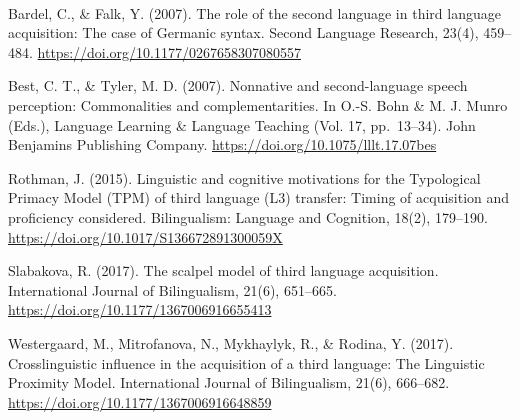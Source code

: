 \documentclass[
  12pt,
]{article}
\begin{document}
\begingroup
\setlength{\parindent}{-0.5in}
\setlength{\leftskip}{0.5in}
\phantom{.}

\textcolor{white}{\\} \vspace{-0.5in}

Bardel, C., \& Falk, Y. (2007). The role of the second language in third
language acquisition: The case of Germanic syntax. Second Language
Research, 23(4), 459--484.
\url{https://doi.org/10.1177/0267658307080557}

Best, C. T., \& Tyler, M. D. (2007). Nonnative and second-language
speech perception: Commonalities and complementarities. In O.-S. Bohn \&
M. J. Munro (Eds.), Language Learning \& Language Teaching (Vol. 17,
pp.~13--34). John Benjamins Publishing Company.
\url{https://doi.org/10.1075/lllt.17.07bes}

Rothman, J. (2015). Linguistic and cognitive motivations for the
Typological Primacy Model (TPM) of third language (L3) transfer: Timing
of acquisition and proficiency considered. Bilingualism: Language and
Cognition, 18(2), 179--190.
\url{https://doi.org/10.1017/S136672891300059X}

Slabakova, R. (2017). The scalpel model of third language acquisition.
International Journal of Bilingualism, 21(6), 651--665.
\url{https://doi.org/10.1177/1367006916655413}

Westergaard, M., Mitrofanova, N., Mykhaylyk, R., \& Rodina, Y. (2017).
Crosslinguistic influence in the acquisition of a third language: The
Linguistic Proximity Model. International Journal of Bilingualism,
21(6), 666--682. \url{https://doi.org/10.1177/1367006916648859}

\endgroup
\end{document}
